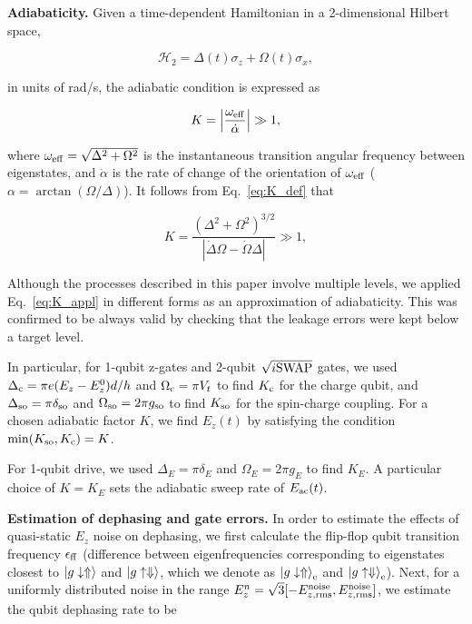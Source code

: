 \documentclass[aps,prb,superscriptaddress,nobibnotes,preprint]{revtex4-1}%
\begin{document}
{\small
\noindent\textbf{Adiabaticity.}
%
Given a time-dependent Hamiltonian in a 2-dimensional Hilbert space,

\begin{equation}
\mathcal{H}_2=\Delta(t)\sigma_z+\Omega(t)\sigma_x,
\end{equation}

in units of rad/s, the adiabatic condition is expressed as \cite{Garwood2001}

\begin{equation} \label{eq:K_def}
K=\left|\frac{\omega_{\rm eff}}{\dot{\alpha}}\right|\gg1,
\end{equation}

where $\omega_{\rm eff}=\sqrt{\Delta^2+\Omega^2}$ is the instantaneous transition angular frequency between eigenstates, and $\dot{\alpha}$ is the rate of change of the orientation of $\omega_{\rm eff}$ ($\alpha=\arctan{(\Omega/\Delta)}$). It follows from Eq.~\ref{eq:K_def} that

\begin{equation} \label{eq:K_appl}
K=\frac{\left(\Delta^2+\Omega^2\right)^{3/2}}{|\dot{\Delta}\Omega-\dot{\Omega}\Delta|}\gg1,
\end{equation}

Although the processes described in this paper involve multiple levels, we applied Eq.~\ref{eq:K_appl} in different forms as an approximation of adiabaticity. This was confirmed to be always valid by checking that the leakage errors were kept below a target level.

In particular, for 1-qubit z-gates and 2-qubit $\sqrt{i{\rm SWAP}}$ gates, we used $\Delta_{\rm c}=\pi e(E_z - E_z^0)d/h$ and $\Omega_{\rm c}=\pi V_t$ to find $K_{\rm c}$ for the charge qubit, and $\Delta_{\rm so}=\pi\delta_{\rm so}$ and $\Omega_{\rm so}=2\pi g_{\rm so}$ to find $K_{\rm so}$ for the spin-charge coupling. For a chosen adiabatic factor $K$, we find $E_z(t)$ by satisfying the condition $\min(K_{\rm so},K_{\rm c})=K$.

For 1-qubit drive, we used $\Delta_E=\pi\delta_E$ and $\Omega_{E}=2\pi g_E$ to find $K_E$. A particular choice of $K=K_E$ sets the adiabatic sweep rate of $E_{\rm ac}(t)$.


\vspace{3mm}
\noindent\textbf{Estimation of dephasing and gate errors.}
%
In order to estimate the effects of quasi-static $E_z$ noise on dephasing, we first calculate the flip-flop qubit transition frequency $\epsilon_{\rm ff}$ (difference between eigenfrequencies corresponding to eigenstates closest to $\ket{g\downarrow\Uparrow}$ and $\ket{g\uparrow\Downarrow}$, which we denote as $\ket{g\downarrow\Uparrow}_{\rm e}$ and $\ket{g\uparrow\Downarrow}_{\rm e}$). Next, for a uniformly distributed noise in the range $E_z^n=\sqrt{3}[-E_{z,\rm rms}^{\rm noise},E_{z,\rm rms}^{\rm noise}]$, we estimate the qubit dephasing rate to be 

}
\end{document}
